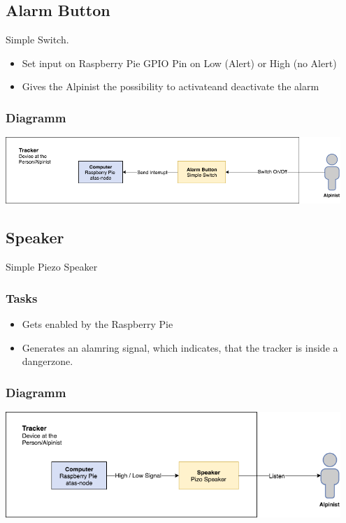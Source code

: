 \documentclass[a4paper,11pt, oneside]{report}
\theoremstyle{definition}
\begin{document}
\newpage
\subsection{Alarm Button}
Simple Switch.
\begin{itemize}
\item Set input on Raspberry Pie GPIO Pin on Low (Alert) or High (no Alert)
\item Gives the Alpinist the possibility to activateand deactivate the alarm
\end{itemize}

\subsubsection{Diagramm}
\includegraphics[width=0.95\textwidth]{img/ATAS_SystemOverview_Detail_AlarmButton.png}

\subsection{Speaker}
Simple Piezo Speaker
\subsubsection{Tasks}
\begin{itemize}
\item Gets enabled by the Raspberry Pie
\item Generates an alamring signal, which indicates, that the tracker is inside a dangerzone.
\end{itemize}

\subsubsection{Diagramm}
\includegraphics[width=0.95\textwidth]{img/ATAS_SystemOverview_Detail_Sound.png}
\end{document}
